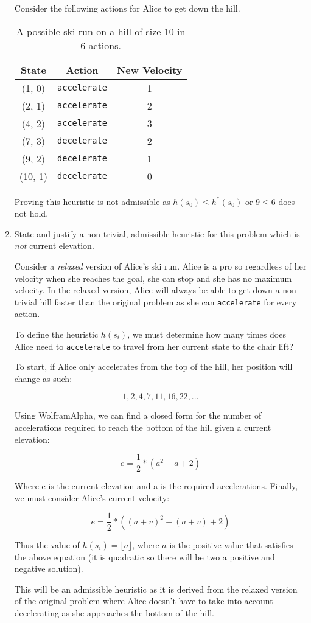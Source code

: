 \documentclass[fleqn]{hermans-hw}
\newcommand{\floor}[1]{\lfloor #1 \rfloor}
\begin{document}
\begin{enumerate}
Consider the following actions for Alice to get down the hill. 

\begin{table}[H]
\centering
{\renewcommand{\arraystretch}{1.2}%
\begin{tabular}{| c | c | c |}
\hline
\textbf{State} & \textbf{Action} & \textbf{New Velocity} \\
\hline
(1, 0) & \texttt{accelerate} & 1 \\ \hline
(2, 1) & \texttt{accelerate} & 2 \\ \hline
(4, 2) & \texttt{accelerate} & 3 \\ \hline
(7, 3) & \texttt{decelerate} & 2 \\ \hline
(9, 2) & \texttt{decelerate} & 1 \\ \hline
(10, 1) & \texttt{decelerate} & 0 \\ \hline
\end{tabular}}
\caption{A possible ski run on a hill of size 10 in 6 actions.}
\end{table}

Proving this heuristic is not admissible as $h(s_0) \leq h^*(s_0)$ or $9 \leq 6$ does not hold.

\item State and justify a non-trivial, admissible heuristic for this
problem which is \emph{not} current elevation.

Consider a \textit{relaxed} version of Alice's ski run. Alice is a pro so regardless of her velocity when she reaches the goal, she can stop and she has no maximum velocity. In the relaxed version, Alice will always be able to get down a non-trivial hill faster than the original problem as she can \texttt{accelerate} for every action.

To define the heuristic $h(s_i)$, we must determine how many times does Alice need to \texttt{accelerate} to travel from her current state to the chair lift?

To start, if Alice only accelerates from the top of the hill, her position will change as such:

$$1, 2, 4, 7, 11, 16, 22, ...$$

Using WolframAlpha, we can find a closed form for the number of accelerations required to reach the bottom of the hill given a current elevation:

$$e = \frac{1}{2} * (a^2 - a + 2)$$

Where e is the current elevation and a is the required accelerations. Finally, we must consider Alice's current velocity:

$$e = \frac{1}{2} * ((a + v)^2 - (a + v) + 2)$$

Thus the value of $h(s_i) = \floor{a}$, where $a$ is the positive value that satisfies the above equation (it is quadratic so there will be two a positive and negative solution).

This will be an admissible heuristic as it is derived from the relaxed version of the original problem where Alice doesn't have to take into account decelerating as she approaches the bottom of the hill.


\end{enumerate}
\end{document}
